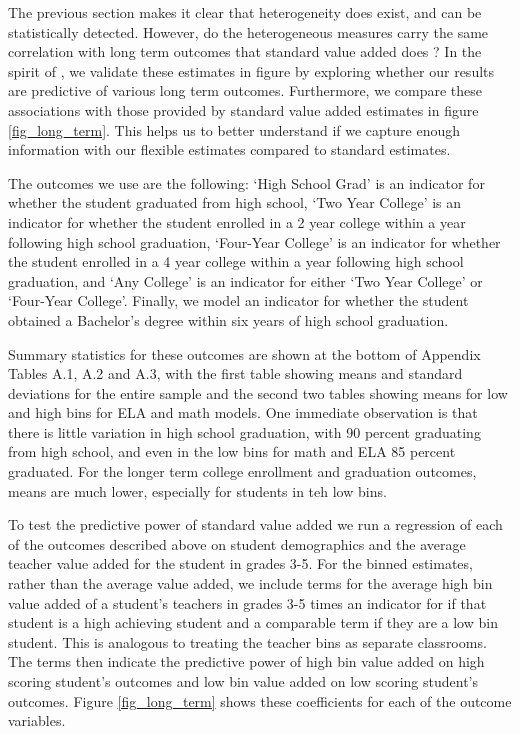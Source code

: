 \documentclass[12pt]{article}
\theoremstyle{definition}
\theoremstyle{definition}
\theoremstyle{definition}
\theoremstyle{definition}
\begin{document}
    The previous section makes it clear that heterogeneity does exist, and can be statistically detected. However, do the heterogeneous measures carry the same correlation with long term outcomes that standard value added does \citep{chetty2014measuring2}? In the spirit of \citet{chetty2014measuring2}, we validate these estimates in figure by exploring whether our results are predictive of various long term outcomes. Furthermore, we compare these associations with those provided by standard value added estimates in figure \ref{fig_long_term}. This helps us to better understand if we capture enough information with our flexible estimates compared to standard estimates.
    
    The outcomes we use are the following: `High School Grad' is an indicator for whether the student graduated from high school, `Two Year College' is an indicator for whether the student enrolled in a 2 year college within a year following high school graduation, `Four-Year College' is an indicator for whether the student enrolled in a 4 year college within a year following high school graduation, and `Any College' is an indicator for either `Two Year College' or `Four-Year College'. Finally, we model an indicator for whether the student obtained a Bachelor's degree within six years of high school graduation.
    
    Summary statistics for these outcomes are shown at the bottom of Appendix Tables A.1, A.2 and A.3, with the first table showing means and standard deviations for the entire sample and the second two tables showing means for low and high bins for ELA and math models.  One immediate observation is that there is little variation in high school graduation, with 90 percent graduating from high school, and even in the low bins for math and ELA 85 percent graduated. For the longer term college enrollment and graduation outcomes, means are much lower, especially for students in teh low bins.  
    
    To test the predictive power of standard value added we run a regression of each of the outcomes described above on student demographics and the average teacher value added for the student in grades 3-5. For the binned estimates, rather than the average value added, we include terms for the average high bin value added of a student's teachers in grades 3-5 times an indicator for if that student is a high achieving student and a comparable term if they are a low bin student. This is analogous to treating the teacher bins as separate classrooms. The terms then indicate the predictive power of high bin value added on high scoring student's outcomes and low bin value added on low scoring student's outcomes. Figure \ref{fig_long_term} shows these coefficients for each of the outcome variables. 
\end{document}
